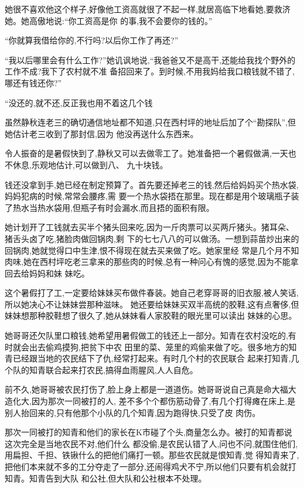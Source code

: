 ﻿\documentclass[12pt]{article}
\begin{document}
她很不喜欢他这个样子,好像他工资高就很了不起一样,就居高临下地看她,要救济她。她高傲地说:``你工资高是你
的事,我不会要你的钱的。''

``你\myrule 就算我借给你的,不行吗?以后你\myrule 工作了再还?''

``我以后哪里会有什么工作?''她讥讽地说,``我爸爸又不是高干,还能给我找个野外的工作不成?我下了农村就不准
备招回来了。到时候,不用我妈给我口粮钱就不错了,哪还有钱还你?''

``没还的,就不还,反正我也\myrule 用不着这几个钱\myrule 


虽然静秋连老三的确切通信地址都不知道,只在西村坪的地址后加了个``勘探队'',但她估计老三收到了那封信,因为
他没再送什么东西来。

令人振奋的是暑假快到了,静秋又可以去做零工了。她准备把一个暑假做满,一天也不休息,乐观地估计,可以做到八、
九十块钱。

钱还没拿到手,她已经在制定预算了。首先要还掉老三的钱,然后给妈妈买个热水袋,妈妈犯病的时候,常常会腰疼,需
要一个热水袋捂在那里。现在都是用个玻璃瓶子装了热水当热水袋用,但瓶子有时会漏水,而且捂的面积有限。

她计划开了工钱就去买半个猪头回来吃,因为一斤肉票可以买两斤猪头。猪耳朵、猪舌头卤了吃,猪脸肉做回锅肉,剩
下的七七八八的可以做汤。一想到蒜苗炒出来的回锅肉,她就觉得口中生津,恨不得现在就去买来做了吃。她家里经
常是几个月不知肉味,她在西村坪吃老三拿来的那些肉的时候,总有一种问心有愧的感觉,因为不能拿回去给妈妈和妹
妹吃。

这个暑假打了工,一定要给妹妹买布做件春装。她自己老穿哥哥的旧衣服,被人笑话,所以她决心不让妹妹尝那种滋味。
她还要给妹妹买双半高统的胶鞋,这有点奢侈,但妹妹想那种胶鞋想了很久了,她从妹妹看人家胶鞋的眼光里可以读出
妹妹的心思。

她哥哥还欠队里口粮钱,她希望用暑假做工的钱还上一部分。知青在农村没吃的,有时就会出去偷鸡摸狗,把贫下中农
田里的菜、笼里的鸡偷来做了吃。很多地方的知青已经跟当地的农民结下了仇,经常打起来。有时几个村的农民联合
起来打知青,几个队的知青联合起来打农民,搞得血雨腥风,人人自危。

前不久,她哥哥被农民打伤了,脸上身上都是一道道伤。她哥哥说自己真是命大福大造化大,因为那次一同被打的人,
差不多个个都伤筋动骨了,有几个打得瘫在床上,是别人抬回来的,只有他那个小队的几个知青,因为跑得快,只受了皮
肉伤。

那次一同被打的知青和他们的家长在K市碰了个头,商量怎么办。被打的知青都说这次完全是当地农民不对,他们什么
都没偷,是农民认错了人,问也不问,就围住他们,用扁担、千担、铁锹什么的把他们痛打一顿。那些农民就是恨知青,觉
得知青来了,把他们本来就不多的工分夺走了一部分,还闹得鸡犬不宁,所以他们只要有机会就打知青。知青告到大队
和公社,但大队和公社根本不处理。
\end{document}
